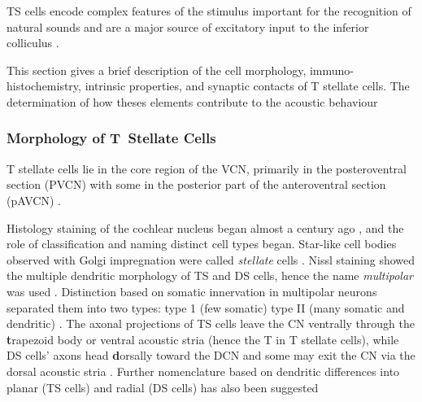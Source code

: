 
 TS cells encode complex features of the stimulus important for the recognition of
 natural sounds and are a major source of excitatory input to the inferior colliculus
 \citep{OertelWrightEtAl:2010}.

 This section gives a brief description of the cell morphology,
 immuno-histochemistry, intrinsic properties, and synaptic contacts of T stellate
 cells. The determination of how theses elements contribute to the acoustic behaviour

\subsubsection{Morphology of T~Stellate Cells}\label{sec:morph-t-stell}

 T stellate cells lie in the core region of the VCN, primarily in the posteroventral
 section (PVCN) with some in the posterior part of the anteroventral section (pAVCN)
 \citep{Osen:1969,Lorente:1981,BrawerMorestEtAl:1974,OertelWuEtAl:1990,DoucetRyugo:2006,DoucetRyugo:1997}.

 Histology staining of the cochlear nucleus began almost a century ago
 \citep{Lorente:1933}, and the role of classification and naming distinct cell types
 began. Star-like cell bodies observed with Golgi impregnation were called
 \textit{stellate} cells \citep{Osen:1969}. Nissl staining showed the multiple
 dendritic morphology of TS and DS cells, hence the name \textit{multipolar} was used
 \citep{BrawerMorestEtAl:1974,Lorente:1981}.  Distinction based on somatic
 innervation in multipolar neurons separated them into two types: type 1 (few
 somatic) type II (many somatic and dendritic) \citep{Cant:1981}.  The axonal
 projections of TS cells leave the CN ventrally through the \textbf{t}rapezoid body
 or ventral acoustic stria (hence the T in T stellate cells), while DS cells' axons
 head \textbf{d}orsally toward the DCN and some may exit the CN via the dorsal
 acoustic stria \citep{OertelWuEtAl:1990}.  Further nomenclature based on dendritic
 differences into planar (TS cells) and radial (DS cells) has also been suggested
 \citep{DoucetRyugo:1997,DoucetRyugo:2006}


